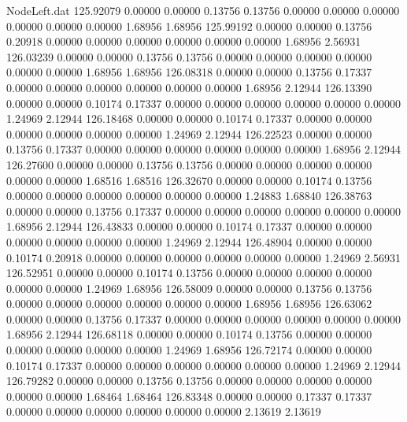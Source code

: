 \begin{filecontents}{NodeLeft.dat}
 125.92079    0.00000    0.00000     0.13756    0.13756    0.00000    0.00000    0.00000    0.00000    0.00000    0.00000    1.68956    1.68956
 125.99192    0.00000    0.00000     0.13756    0.20918    0.00000    0.00000    0.00000    0.00000    0.00000    0.00000    1.68956    2.56931
 126.03239    0.00000    0.00000     0.13756    0.13756    0.00000    0.00000    0.00000    0.00000    0.00000    0.00000    1.68956    1.68956
 126.08318    0.00000    0.00000     0.13756    0.17337    0.00000    0.00000    0.00000    0.00000    0.00000    0.00000    1.68956    2.12944
 126.13390    0.00000    0.00000     0.10174    0.17337    0.00000    0.00000    0.00000    0.00000    0.00000    0.00000    1.24969    2.12944
 126.18468    0.00000    0.00000     0.10174    0.17337    0.00000    0.00000    0.00000    0.00000    0.00000    0.00000    1.24969    2.12944
 126.22523    0.00000    0.00000     0.13756    0.17337    0.00000    0.00000    0.00000    0.00000    0.00000    0.00000    1.68956    2.12944
 126.27600    0.00000    0.00000     0.13756    0.13756    0.00000    0.00000    0.00000    0.00000    0.00000    0.00000    1.68516    1.68516
 126.32670    0.00000    0.00000     0.10174    0.13756    0.00000    0.00000    0.00000    0.00000    0.00000    0.00000    1.24883    1.68840
 126.38763    0.00000    0.00000     0.13756    0.17337    0.00000    0.00000    0.00000    0.00000    0.00000    0.00000    1.68956    2.12944
 126.43833    0.00000    0.00000     0.10174    0.17337    0.00000    0.00000    0.00000    0.00000    0.00000    0.00000    1.24969    2.12944
 126.48904    0.00000    0.00000     0.10174    0.20918    0.00000    0.00000    0.00000    0.00000    0.00000    0.00000    1.24969    2.56931
 126.52951    0.00000    0.00000     0.10174    0.13756    0.00000    0.00000    0.00000    0.00000    0.00000    0.00000    1.24969    1.68956
 126.58009    0.00000    0.00000     0.13756    0.13756    0.00000    0.00000    0.00000    0.00000    0.00000    0.00000    1.68956    1.68956
 126.63062    0.00000    0.00000     0.13756    0.17337    0.00000    0.00000    0.00000    0.00000    0.00000    0.00000    1.68956    2.12944
 126.68118    0.00000    0.00000     0.10174    0.13756    0.00000    0.00000    0.00000    0.00000    0.00000    0.00000    1.24969    1.68956
 126.72174    0.00000    0.00000     0.10174    0.17337    0.00000    0.00000    0.00000    0.00000    0.00000    0.00000    1.24969    2.12944
 126.79282    0.00000    0.00000     0.13756    0.13756    0.00000    0.00000    0.00000    0.00000    0.00000    0.00000    1.68464    1.68464
 126.83348    0.00000    0.00000     0.17337    0.17337    0.00000    0.00000    0.00000    0.00000    0.00000    0.00000    2.13619    2.13619

\end{filecontents}

